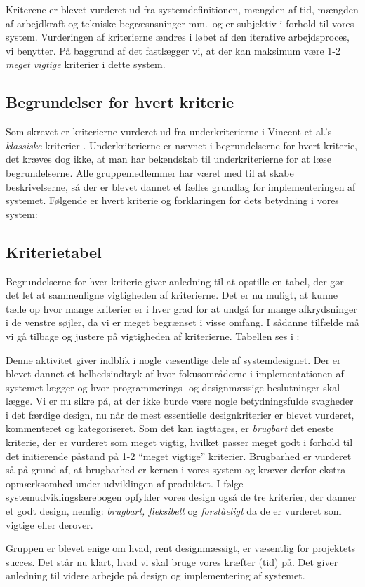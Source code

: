 Kriterene er blevet vurderet ud fra systemdefinitionen, mængden af tid, mængden af arbejdkraft og tekniske begræsnsninger mm.\ og er subjektiv i forhold til vores system. Vurderingen af kriterierne ændres i løbet af den iterative arbejdsproces, vi benytter. På baggrund af det fastlægger vi, at der kan maksimum være 1-2 \emph{meget vigtige} kriterier i dette system.

\subsection{Begrundelser for hvert kriterie}
Som skrevet er kriterierne vurderet ud fra underkriterierne i Vincent et al.'s \emph{klassiske} kriterier \cite[s.~12]{crit}. Underkriterierne er nævnet i begrundelserne for hvert kriterie, det kræves dog ikke, at man har bekendskab til underkriterierne for at læse begrundelserne. Alle gruppemedlemmer har været med til at skabe beskrivelserne, så der er blevet dannet et fælles grundlag for implementeringen af systemet. Følgende er hvert kriterie og forklaringen for dets betydning i vores system:



\subsection{Kriterietabel}
Begrundelserne for hver kriterie giver anledning til at opstille en tabel, der gør det let at sammenligne vigtigheden af kriterierne. Det er nu muligt, at kunne tælle op hvor mange kriterier er i hver grad for at undgå for mange afkrydsninger i de venstre søjler, da vi er meget begrænset i visse omfang. I sådanne tilfælde må vi gå tilbage og justere på vigtigheden af kriterierne. Tabellen ses i :



Denne aktivitet giver indblik i nogle væsentlige dele af systemdesignet. Der er blevet dannet et helhedsindtryk af hvor fokusområderne i implementationen af systemet lægger og hvor programmerings- og designmæssige beslutninger skal lægge. Vi er nu sikre på, at der ikke burde være nogle betydningsfulde svagheder i det færdige design, nu når de mest essentielle designkriterier er blevet vurderet, kommenteret og kategoriseret. Som det kan iagttages, er \emph{brugbart} det eneste kriterie, der er vurderet som meget vigtig, hvilket passer meget godt i forhold til det initierende påstand på 1-2 ``meget vigtige'' kriterier. Brugbarhed er vurderet så på grund af, at brugbarhed er kernen i vores system og kræver derfor ekstra opmærksomhed under udviklingen af produktet. I følge systemudviklingslærebogen \cite{ooad} opfylder vores design også de tre kriterier, der danner et godt design, nemlig: \emph{brugbart, fleksibelt} og \emph{forståeligt} da de er vurderet som vigtige eller derover.

Gruppen er blevet enige om hvad, rent designmæssigt, er væsentlig for projektets succes. Det står nu klart, hvad vi skal bruge vores kræfter (tid) på. Det giver anledning til videre arbejde på design og implementering af systemet.
